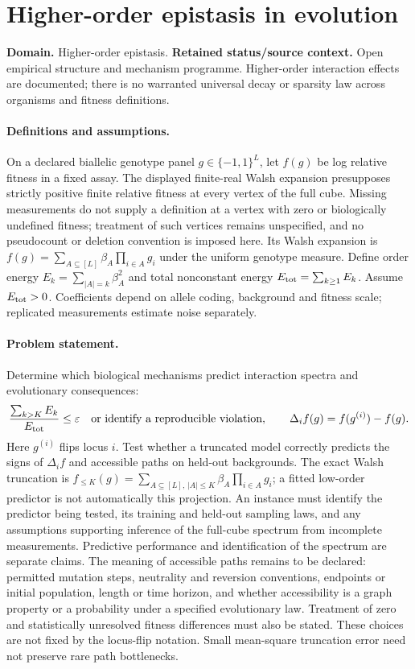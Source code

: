 \documentclass[11pt]{article}
\begin{document}
\section*{Higher-order epistasis in evolution}
\label{prob:143}
\label{rank:88}
\par\smallskip

\noindent\textbf{Domain.} Higher-order epistasis. \quad \textbf{Retained status/source context.} Open empirical structure and mechanism programme. Higher-order interaction effects are documented; there is no warranted universal decay or sparsity law across organisms and fitness definitions.
\paragraph{Definitions and assumptions.} On a declared biallelic genotype panel $g\in\{-1,1\}^L$, let $f(g)$ be log relative fitness in a fixed assay. The displayed finite-real Walsh expansion presupposes strictly positive finite relative fitness at every vertex of the full cube. Missing measurements do not supply a definition at a vertex with zero or biologically undefined fitness; treatment of such vertices remains unspecified, and no pseudocount or deletion convention is imposed here. Its Walsh expansion is $f(g)=\sum_{A\subseteq[L]}\beta_A\prod_{i\in A}g_i$ under the uniform genotype measure. Define order energy $E_k=\sum_{|A|=k}\beta_A^2$ and total nonconstant energy $E_{\rm tot}=\sum_{k\geq1}E_k$. Assume $E_{\rm tot}>0$. Coefficients depend on allele coding, background and fitness scale; replicated measurements estimate noise separately.
\paragraph{Problem statement.} Determine which biological mechanisms predict interaction spectra and evolutionary consequences:
\[
\frac{\sum_{k>K}E_k}{E_{\rm tot}}\leq\varepsilon
\quad\text{or identify a reproducible violation},
\qquad
\Delta_if(g)=f(g^{(i)})-f(g).
\]
Here $g^{(i)}$ flips locus $i$. Test whether a truncated model correctly predicts the signs of $\Delta_i f$ and accessible paths on held-out backgrounds. The exact Walsh truncation is $f_{\leq K}(g)=\sum_{A\subseteq[L],\,|A|\leq K}\beta_A\prod_{i\in A}g_i$; a fitted low-order predictor is not automatically this projection. An instance must identify the predictor being tested, its training and held-out sampling laws, and any assumptions supporting inference of the full-cube spectrum from incomplete measurements. Predictive performance and identification of the spectrum are separate claims. The meaning of accessible paths remains to be declared: permitted mutation steps, neutrality and reversion conventions, endpoints or initial population, length or time horizon, and whether accessibility is a graph property or a probability under a specified evolutionary law. Treatment of zero and statistically unresolved fitness differences must also be stated. These choices are not fixed by the locus-flip notation. Small mean-square truncation error need not preserve rare path bottlenecks.
\end{document}
